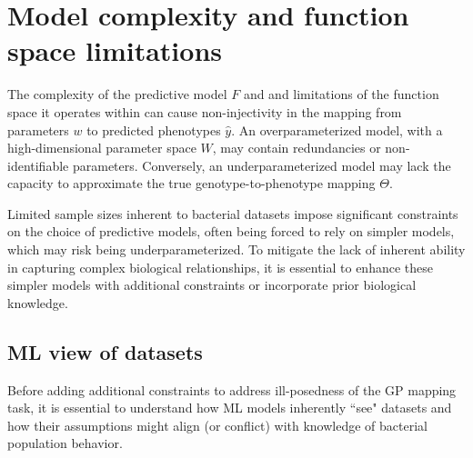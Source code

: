 \documentclass[12pt]{article}
\begin{document}
\section{Model complexity and function space limitations}




The complexity of the predictive model $F$ and and limitations of the function space it operates within can cause non-injectivity in the mapping from parameters $w$ to predicted phenotypes $\hat{y}$. An overparameterized model, with a high-dimensional parameter space $W$, may contain redundancies or non-identifiable parameters. Conversely, an underparameterized model may lack the capacity to approximate the true genotype-to-phenotype mapping $\Theta$. 
 
Limited sample sizes inherent to bacterial datasets impose significant constraints on the choice of predictive models, often being forced to rely on simpler models, which may risk being underparameterized. To mitigate the lack of inherent ability in capturing complex biological relationships, it is essential to enhance these simpler models with additional constraints or incorporate prior biological knowledge.


\subsection{ML view of datasets}\label{sec:ML_view_data}

Before adding additional constraints to address ill-posedness of the GP mapping task, it is essential to understand how ML models inherently ``see" datasets and how their assumptions might align (or conflict) with knowledge of bacterial population behavior. 
\end{document}
